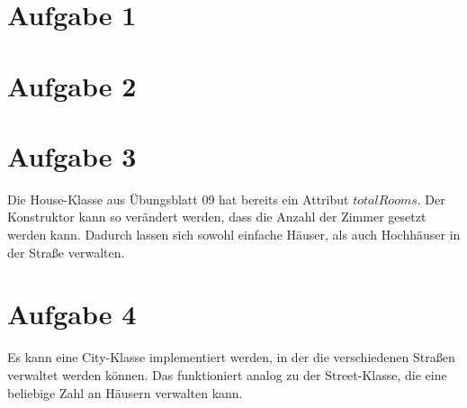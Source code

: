 
\usepackage{svg}

\newcommand{\dozent}{Prof. Dr. Claudia Müller-Birn, Barry Linnert}					%
\newcommand{\tutor}{Thierry Meurers}						%
\newcommand{\tutoriumNo}{10}				%
\newcommand{\ubungNo}{11}									%
\newcommand{\veranstaltung}{Objektorientierte Programmierung}	%
\newcommand{\semester}{SoSe 17}						%
\newcommand{\studenten}{Stefaan Hessmann, Jaap Pedersen, Mark Niehues}			%




\section{Aufgabe 1}
\section{Aufgabe 2}

\section{Aufgabe 3}
Die House-Klasse aus Übungsblatt 09 hat bereits ein Attribut $totalRooms$. Der Konstruktor kann so verändert werden, dass die Anzahl der Zimmer gesetzt werden kann. Dadurch lassen sich sowohl einfache Häuser, als auch Hochhäuser in der Straße verwalten.
\section{Aufgabe 4}
Es kann eine City-Klasse implementiert werden, in der die verschiedenen Straßen verwaltet werden können. Das funktioniert analog zu der Street-Klasse, die eine beliebige Zahl an Häusern verwalten kann.


